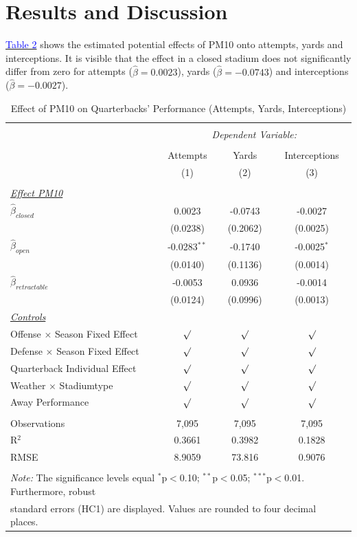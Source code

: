 \documentclass[12pt,a4paper]{article}
\newcommand{\mylink}[2]{\hyperref[#1]{\textcolor{blue}{#2}}}
\begin{document}
{\clearpage \section{Results and Discussion}
\label{5}
\mylink{T2}{Table 2} shows the estimated potential effects of PM10 onto attempts, yards and interceptions. It is visible that the effect in a closed stadium does not significantly differ from zero for attempts ($\hat{\beta} = 0.0023$), yards ($\hat{\beta} = -0.0743$) and interceptions ($\hat{\beta} = -0.0027$). 
\begin{table}[!htbp] \centering 
 \caption{Effect of PM10 on Quarterbacks' Performance (Attempts, Yards, Interceptions)} 
 \label{T2} 
\begin{tabular}{@{\extracolsep{5pt}}lccc} 
\\[-1.8ex]\hline 
\hline \\[-1.8ex] 
 & \multicolumn{3}{c}{\textit{Dependent Variable:}} \\ \cline{2-4} \\ [-1.8ex]
 & Attempts & Yards & Interceptions \\ 
 & (1) & (2) & (3)\\ \hline \\[-1.8ex] 
 \underline{\textit{Effect PM10}}\\[0.4cm]
 $\hat{\beta}_{closed}$& 0.0023 & -0.0743 & -0.0027 \\ 
 & (0.0238) & (0.2062)& (0.0025) \\[0.4cm]
 $\hat{\beta}_{open}$& -0.0283$^{**}$ & -0.1740 & -0.0025$^{*}$\\ 
 & (0.0140) & (0.1136) & (0.0014) \\[0.4cm]
 $\hat{\beta}_{retractable}$& -0.0053 & 0.0936 & -0.0014 \\ 
 & (0.0124) & (0.0996) & (0.0013)\\ [0.4cm]
 \underline{\textit{Controls}} \\[0.4cm]
 Offense $\times$ Season Fixed Effect & $\surd$ & $\surd$ & $\surd$ \\[0.4cm]
 Defense $\times$ Season Fixed Effect & $\surd$ & $\surd$ & $\surd$ \\[0.4cm]
 Quarterback Individual Effect & $\surd$ & $\surd$ & $\surd$ \\[0.4cm]
 Weather $\times $ Stadiumtype & $\surd$ & $\surd$ & $\surd$ \\[0.4cm]
 Away Performance & $\surd$ & $\surd$ & $\surd$\\
\hline \\[-1.8ex] 
Observations & 7,095 & 7,095 & 7,095 \\ 
R$^{2}$ & 0.3661 & 0.3982 & 0.1828\\ 
RMSE & 8.9059 & 73.816 & 0.9076\\ \hline 
\hline \\[-1.8ex] 
\multicolumn{4}{l}{\footnotesize \textit{Note:} The significance levels equal {$^{*}$p$<$0.10; $^{**}$p$<$0.05; $^{***}$p$<$0.01}. Furthermore, robust} \\ \multicolumn{4}{l}{\footnotesize standard errors (HC1) are displayed. Values are rounded to four decimal places.}
 \end{tabular}
\end{table} 

}
\end{document}
